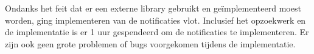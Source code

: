 Ondanks het feit dat er een externe library gebruikt en geïmplementeerd moest worden, ging implementeren van de 
notificaties vlot. Inclusief het opzoekwerk en de implementatie is er 1 uur gespendeerd om de notificaties 
te implementeren. Er zijn ook geen grote problemen of bugs voorgekomen tijdens de implementatie.

